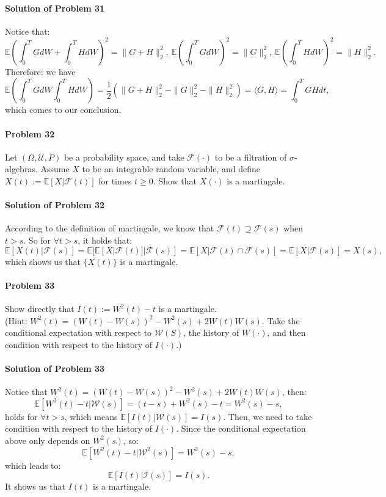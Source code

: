 \documentclass{article}
\begin{document}
\paragraph{Solution of Problem 31} Notice that:
\[\mathbb{E}\left(\int_0^T GdW +\int_0^T HdW\right)^2 = \|G+H\|_2^2, ~\mathbb{E}\left(\int_0^T GdW\right)^2 = \|G\|_2^2, ~\mathbb{E}\left(\int_0^T HdW\right)^2 = \|H\|_2^2.\]
Therefore: we have 
\[\mathbb{E}\left(\int_0^T GdW \int_0^T HdW\right) = \frac{1}{2}\left(\|G+H\|_2^2-\|G\|_2^2-\|H\|_2^2\right)=\langle G,H\rangle=\int_0^T GHdt,\]
which comes to our conclusion. 

\paragraph{Problem 32} Let $(\Omega, \mathcal U, P)$ be a probability space, and take $\mathcal F(\cdot)$ to be a filtration of $\sigma$-algebras. Assume $X$ to be an integrable random variable, and define $X(t):=\mathbb{E}[X|\mathcal F(t)]$ for times $t\geqslant 0$. Show that $X(\cdot)$ is a martingale. 

\paragraph{Solution of Problem 32} According to the definition of martingale, we know that $\mathcal F(t)\supseteq \mathcal F(s)$ when $t>s$. So for $\forall t>s$, it holds that:
\[\mathbb{E}[X(t)|\mathcal F(s)]=\mathbb{E}[\mathbb{E}[X|\mathcal F(t)]|\mathcal F(s)] = \mathbb{E}[X|\mathcal F(t)\cap \mathcal F(s)]=\mathbb{E}[X|\mathcal F(s)]=X(s),\]
which shows us that $\{X(t)\}$ is a martingale. 

\paragraph{Problem 33} Show directly that $I(t):=W^2(t)-t$ is a martingale. \\
(Hint: $W^2(t)=(W(t)-W(s))^2-W^2(s)+2W(t)W(s)$. Take the conditional expectation with respect to $\mathcal W(S)$, the history of $W(\cdot)$, and then condition with respect to the history of $I(\cdot)$.)

\paragraph{Solution of Problem 33} Notice that $W^2(t)=(W(t)-W(s))^2-W^2(s)+2W(t)W(s)$, then:
\[\mathbb{E}[W^2(t)-t|\mathcal W(s)] = (t-s)+W^2(s)-t = W^2(s)-s,\]
holds for $\forall t>s$, which means $\mathbb{E}[I(t)|\mathcal W(s)]=I(s)$. Then, we need to take condition with respect to the history of $I(\cdot)$. Since the conditional expectation above only depends on $W^2(s)$, so:
\[\mathbb{E}[W^2(t)-t|\mathcal W^2(s)] = W^2(s)-s,\]
which leads to:
\[\mathbb{E}[I(t)|\mathcal I(s)] = I(s).\]
It shows us that $I(t)$ is a martingale. 
\end{document}
